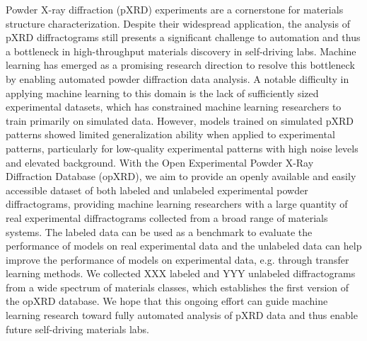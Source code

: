 Powder X-ray diffraction (pXRD) experiments are a cornerstone for materials structure characterization.
Despite their widespread application, the analysis of pXRD diffractograms still presents a significant challenge to automation and thus a bottleneck in high-throughput materials discovery in self-driving labs.
Machine learning has emerged as a promising research direction to resolve this bottleneck by enabling automated powder diffraction data analysis.
A notable difficulty in applying machine learning to this domain is the lack of sufficiently sized experimental datasets, which has constrained machine learning researchers to train primarily on simulated data. However, models trained on simulated pXRD patterns showed limited generalization ability when applied to experimental patterns, particularly for low-quality experimental patterns with high noise levels and elevated background.
With the Open Experimental Powder X-Ray Diffraction Database (opXRD), we aim to provide an openly available and easily accessible dataset of both labeled and unlabeled experimental powder diffractograms, providing machine learning researchers with a large quantity of real experimental diffractograms collected from a broad range of materials systems. The labeled data can be used as a benchmark to evaluate the performance of models on real experimental data and the unlabeled data can help improve the performance of models on experimental data, e.g. through transfer learning methods. 
We collected XXX labeled and YYY unlabeled diffractograms from a wide spectrum of materials classes, which establishes the first version of the opXRD database.
We hope that this ongoing effort can guide machine learning research toward fully automated analysis of pXRD data and thus enable future self-driving materials labs.